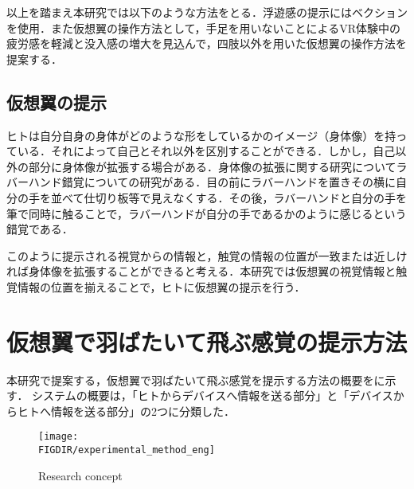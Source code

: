 \begin{small}

    以上を踏まえ本研究では以下のような方法をとる．浮遊感の提示にはベクションを使用．また仮想翼の操作方法として，手足を用いないことによるVR体験中の疲労感を軽減と没入感の増大を見込んで，四肢以外を用いた仮想翼の操作方法を提案する．

  \subsection{仮想翼の提示}
    ヒトは自分自身の身体がどのような形をしているかのイメージ（身体像）を持っている．それによって自己とそれ以外を区別することができる．しかし，自己以外の部分に身体像が拡張する場合がある．身体像の拡張に関する研究についてラバーハンド錯覚についての研究がある\cite{botvinick1998rubber}．目の前にラバーハンドを置きその横に自分の手を並べて仕切り板等で見えなくする．その後，ラバーハンドと自分の手を筆で同時に触ることで，ラバーハンドが自分の手であるかのように感じるという錯覚である．
    
    このように提示される視覚からの情報と，触覚の情報の位置が一致または近しければ身体像を拡張することができると考える．本研究では仮想翼の視覚情報と触覚情報の位置を揃えることで，ヒトに仮想翼の提示を行う．  



  

\section{仮想翼で羽ばたいて飛ぶ感覚の提示方法}
  本研究で提案する，仮想翼で羽ばたいて飛ぶ感覚を提示する方法の概要をに示す．
  システムの概要は，「ヒトからデバイスへ情報を送る部分」と「デバイスからヒトへ情報を送る部分」の2つに分類した．
  
  \begin{figure}[t]
    \begin{center}
      \texttt{[image: \\FIGDIR/experimental\_method\_eng]}%
      \caption{Research concept}
    \end{center}
  \end{figure}


\end{small}
